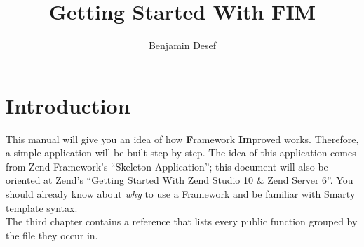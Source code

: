 \documentclass{scrartcl}
\title{Getting Started With FIM}
\author{Benjamin Desef}
\date{\ccbyncsa}
\newcommand{\fim}{\textbf{F}ramework \textbf{Im}proved}
\begin{document}
   \onehalfspacing
   \maketitle
   \tableofcontents \clearpage
   \section{Introduction}
      This manual will give you an idea of how \fim{} works. Therefore, a simple application will be built step-by-step. The idea of this application comes from Zend Framework's ``Skeleton Application'';  this document will also be oriented at Zend's ``Getting Started With Zend Studio 10 \& Zend Server 6''. You should already know about \emph{why} to use a Framework and be familiar with Smarty template syntax. \\
      The third chapter contains a reference that lists every public function grouped by the file they occur in. \enlargethispage{\baselineskip}
\end{document}
